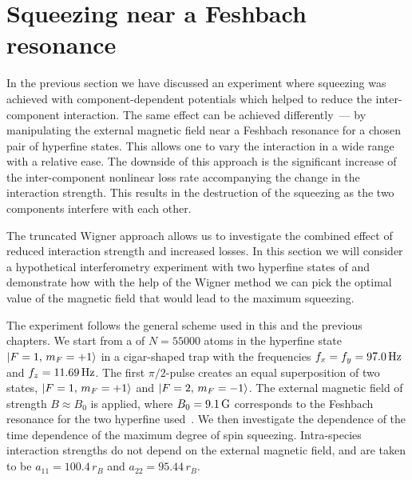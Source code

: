 \section{Squeezing near a Feshbach resonance}

In the previous section we have discussed an experiment where squeezing was achieved with component-dependent potentials which helped to reduce the inter-component interaction.
The same effect can be achieved differently~--- by manipulating the external magnetic field near a Feshbach resonance for a chosen pair of hyperfine states.
This allows one to vary the interaction in a wide range with a relative ease.
The downside of this approach is the significant increase of the inter-component nonlinear loss rate accompanying the change in the interaction strength.
This results in the destruction of the squeezing as the two components interfere with each other.

The truncated Wigner approach allows us to investigate the combined effect of reduced interaction strength and increased losses.
In this section we will consider a hypothetical interferometry experiment with two hyperfine states of \Rb{} and demonstrate how with the help of the Wigner method we can pick the optimal value of the magnetic field that would lead to the maximum squeezing.

The experiment follows the general scheme used in this and the previous chapters.
We start from a  of $N = 55000$ \Rb{} atoms in the hyperfine state ${\mbox{\ensuremath{\left\vert F=1,\, m_F=+1 \right\rangle}}}$ in a cigar-shaped trap with the frequencies $f_x = f_y = 97.0\mbox{\ensuremath{\,\mathrm{Hz}}}$ and $f_z = 11.69\mbox{\ensuremath{\,\mathrm{Hz}}}$.
The first $\pi/2$-pulse creates an equal superposition of two states, ${\mbox{\ensuremath{\left\vert F=1,\, m_F=+1 \right\rangle}}}$ and ${\mbox{\ensuremath{\left\vert F=2,\, m_F=-1 \right\rangle}}}$.
The external magnetic field of strength $B \approx B_0$ is applied, where $B_0 = 9.1\mbox{\ensuremath{\,\mathrm{G}}}$ corresponds to the Feshbach resonance for the two hyperfine used~\cite{Kaufman2009}.
We then investigate the dependence of the time dependence of the maximum degree of spin squeezing.
Intra-species interaction strengths do not depend on the external magnetic field, and are taken to be $a_{11} = 100.4\,r_B$ and $a_{22} = 95.44\,r_B$.

